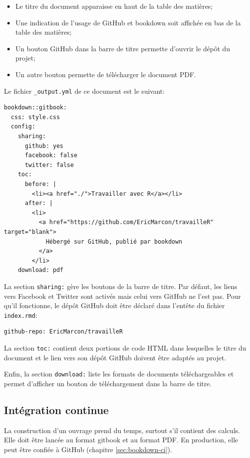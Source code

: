 \documentclass[
  12pt,
  french,
  a4paper,
  extrafontsizes,onecolumn,openright
  ]{memoir}
\providecommand{\tightlist}{%
  \setlength{\itemsep}{0pt}\setlength{\parskip}{0pt}}
\begin{document}
\begin{itemize}
\tightlist
\item
  Le titre du document apparaisse en haut de la table des matières;
\item
  Une indication de l'usage de GitHub et bookdown soit affichée en bas de la table des matières;
\item
  Un bouton GitHub dans la barre de titre permette d'ouvrir le dépôt du projet;
\item
  Un autre bouton permette de télécharger le document PDF.
\end{itemize}

Le fichier \texttt{\_output.yml} de ce document est le suivant:

\begin{verbatim}
bookdown::gitbook:
  css: style.css
  config:
    sharing:
      github: yes
      facebook: false
      twitter: false
    toc:
      before: |
        <li><a href="./">Travailler avec R</a></li>
      after: |
        <li>
          <a href="https://github.com/EricMarcon/travailleR" target="blank">
            Hébergé sur GitHub, publié par bookdown
          </a>
        </li>
    download: pdf
\end{verbatim}

La section \texttt{sharing:} gère les boutons de la barre de titre.
Par défaut, les liens vers Facebook et Twitter sont activés mais celui vers GitHub ne l'est pas.
Pour qu'il fonctionne, le dépôt GitHub doit être déclaré dans l'entête du fichier \texttt{index.rmd}:

\begin{verbatim}
github-repo: EricMarcon/travailleR
\end{verbatim}

La section \texttt{toc:} contient deux portions de code HTML dans lesquelles le titre du document et le lien vers son dépôt GitHub doivent être adaptés au projet.

Enfin, la section \texttt{download:} liste les formats de documents téléchargeables et permet d'afficher un bouton de téléchargement dans la barre de titre.

\hypertarget{sec:rediger-ouvrage-ci}{%
\subsection{Intégration continue}\label{sec:rediger-ouvrage-ci}}

La construction d'un ouvrage prend du temps, surtout s'il contient des calculs.
Elle doit être lancée au format gitbook et au format PDF.
En production, elle peut être confiée à GitHub (chapitre \ref{sec:bookdown-ci}).
\end{document}
